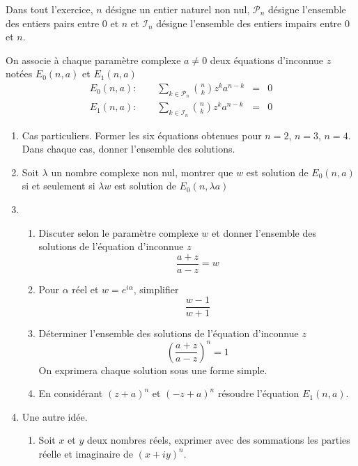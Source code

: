 Dans tout l'exercice, $n$ désigne un entier naturel non nul, $\mathcal P _n$ désigne l'ensemble des entiers pairs entre $0$ et $n$ et $\mathcal I _n$ désigne l'ensemble des entiers impairs entre $0$ et $n$.

On associe à chaque paramètre complexe $a\neq 0$ deux équations d'inconnue $z$ notées $E_0(n,a)$ et $E_1(n,a)$
\begin{eqnarray*}
 E_0(n,a):\quad \quad \sum_{k\in \mathcal P _n} \binom{n}{k} z^k a^{n-k}&=& 0  \\
 E_1(n,a):\quad \quad \sum_{k\in \mathcal I _n} \binom{n}{k} z^k a^{n-k}&=& 0
\end{eqnarray*}

\begin{enumerate}
 \item Cas particuliers. Former les six équations obtenues pour $n=2$, $n=3$, $n=4$. Dans chaque cas, donner l'ensemble des solutions.
 \item Soit $\lambda$ un nombre complexe non nul, montrer que $w$ est solution de $E_0(n,a)$ si et seulement si $\lambda w$ est solution de $E_0(n,\lambda a)$
 \item 
  \begin{enumerate}
    \item Discuter selon le paramètre complexe $w$ et donner l'ensemble des solutions de l'équation d'inconnue $z$
\begin{displaymath}
 \frac{a+z}{a-z} = w
\end{displaymath}
     \item Pour $\alpha$ réel et $w=e^{i\alpha}$, simplifier
\begin{displaymath}
 \frac{w-1}{w+1}
\end{displaymath}
     \item Déterminer l'ensemble des solutions de l'équation d'inconnue $z$
\begin{displaymath}
 \left( \frac{a+z}{a-z}\right) ^n =1
\end{displaymath}
On exprimera chaque solution sous une forme simple.
     \item En considérant $(z+a)^n$ et $(-z+a)^n$ résoudre l'équation $E_1(n,a)$.
  \end{enumerate}
\item Une autre idée.
\begin{enumerate}
 \item Soit $x$ et $y$ deux nombres réels, exprimer avec des sommations les parties réelle et imaginaire de $(x+iy)^n$.

\end{enumerate}
\end{enumerate}
